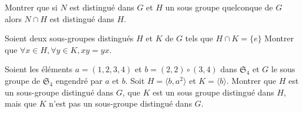 \documentclass{report}
\begin{document}
\begin{exo}
    Montrer que si \(N\) est distingué dans \(G\) et \(H\) un sous groupe quelconque de
    \(G\) alors \(N\cap H\) est distingué dans \(H\).
\end{exo}

\begin{exo}
    Soient deux sous-groupes distingués \(H\) et \(K\) de \(G\) tels que \(H\cap K=\{e\}\)
    Montrer que \(\forall x\in H,\forall y\in K, xy=yx\).
\end{exo}

\begin{exo}
    Soient les éléments \(a=(1,2,3,4)\) et \(b=(2,2)\circ(3,4)\) dans \(\mathfrak{S}_4\)
    et \(G\) le sous groupe de \(\mathfrak{S}_4\) engendré par \(a\) et \(b\). Soit
    \(H=\langle b,a^2\rangle\) et \(K=\langle b\rangle\). Montrer que \(H\) est un sous-groupe
    distingué dans \(G\), que \(K\) est un sous groupe distingué dans \(H\), mais que
    \(K\) n'est pas un sous-groupe distingué dans \(G\).
\end{exo}
\end{document}
